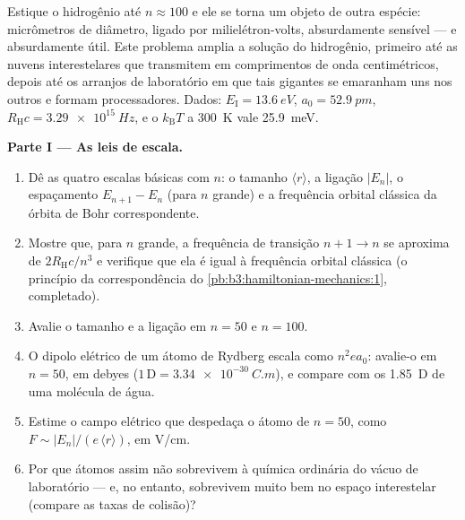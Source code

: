 \begin{problem}\label{pb:b3:hydrogen-atom:1}
Estique o hidrogênio até $n \approx 100$ e ele se torna um objeto de
outra espécie: micrômetros de diâmetro, ligado por milielétron-volts,
absurdamente sensível --- e absurdamente útil. Este problema amplia a
solução do hidrogênio, primeiro até as nuvens interestelares que
transmitem em comprimentos de onda centimétricos, depois até os
arranjos de laboratório em que tais gigantes se emaranham uns nos
outros e formam processadores. Dados:
$E_{\text{I}} = \qty{13.6}{eV}$, $a_0 = \qty{52.9}{pm}$,
$R_{\text{H}}c = \qty{3.29e15}{Hz}$, e o $k_{\text{B}}T$ a
\qty{300}{K} vale \qty{25.9}{meV}.

\medskip\noindent\textbf{Parte I --- As leis de escala.}
\begin{enumerate}
  \item Dê as quatro escalas básicas com $n$: o tamanho $\langle
        r\rangle$, a ligação $|E_n|$, o espaçamento $E_{n+1} - E_n$
        (para $n$ grande) e a frequência orbital clássica da órbita de
        Bohr correspondente.
  \item Mostre que, para $n$ grande, a frequência de transição $n+1 \to
        n$ se aproxima de $2R_{\text{H}}c/n^3$ e verifique
        que ela é igual à frequência orbital clássica (o princípio da
        correspondência do \cref{pb:b3:hamiltonian-mechanics:1},
        completado).
  \item Avalie o tamanho e a ligação em $n = 50$ e $n = 100$.
  \item O dipolo elétrico de um átomo de Rydberg escala como $n^2ea_0$:
        avalie-o em $n = 50$, em debyes ($1\,\text{D} =
        \qty{3.34e-30}{C.m}$), e compare com os \qty{1.85}{D} de uma
        molécula de água.
  \item Estime o campo elétrico que despedaça o átomo de $n = 50$,
        como $F \sim |E_n|/(e\,\langle r\rangle)$, em V/cm.
  \item Por que átomos assim não sobrevivem à química ordinária do
        vácuo de laboratório --- e, no entanto, sobrevivem muito bem no
        espaço interestelar (compare as taxas de colisão)?
\end{enumerate}


\end{problem}
